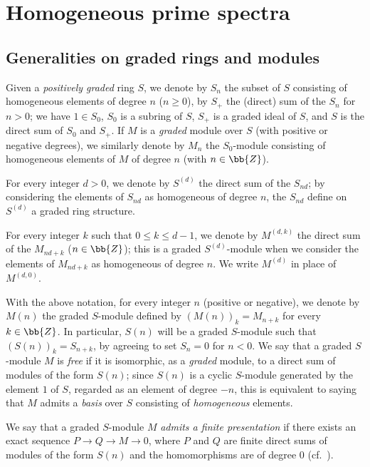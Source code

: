 \section{Homogeneous prime spectra}
\label{section:II.2}

\subsection{Generalities on graded rings and modules}
\label{subsection:II.2.1}

\begin{notation}[2.1.1]
\label{II.2.1.1}
Given a \emph{positively graded} ring $S$, we denote by $S_n$ the subset of $S$ consisting of homogeneous elements of degree $n$ ($n\geq 0$), by $S_+$ the (direct) sum of the $S_n$ for $n>0$;
we have $1\in S_0$, $S_0$ is a subring of $S$, $S_+$ is a graded ideal of $S$, and $S$ is the direct sum of $S_0$ and $S_+$.
If $M$ is a \emph{graded} module over $S$ (with positive or negative degrees), we similarly denote by $M_n$ the $S_0$-module consisting of homogeneous elements of $M$ of degree $n$ (with $n\in\bb{Z}$).

For every integer $d>0$, we denote by $S^{(d)}$ the direct sum of the $S_{nd}$;
by considering the elements of $S_{nd}$ as homogeneous of degree $n$, the $S_{nd}$ define on $S^{(d)}$ a graded ring structure.

For every integer $k$ such that $0\leq k\leq d-1$, we denote by $M^{(d,k)}$ the direct sum
of the $M_{nd+k}$ ($n\in\bb{Z}$);
this is a graded $S^{(d)}$-module when we consider the elements of $M_{nd+k}$ as homogeneous of degree $n$.
We write $M^{(d)}$ in place of $M^{(d,0)}$.

With the above notation, for every integer $n$ (positive or negative), we denote by $M(n)$ the graded $S$-module defined by $(M(n))_k=M_{n+k}$ for every $k\in\bb{Z}$.
In particular, $S(n)$ will be a graded $S$-module such that $(S(n))_k=S_{n+k}$, by agreeing to set $S_n=0$ for $n<0$.
We say that a graded $S$-module $M$ is \emph{free} if it is isomorphic, as a \emph{graded} module, to a direct sum of modules of the form $S(n)$;
since $S(n)$ is a cyclic $S$-module generated by the element $1$ of $S$, regarded as an element of degree $-n$, this is equivalent to saying that $M$ admits a \emph{basis} over $S$ consisting of \emph{homogeneous} elements.

We say that a graded $S$-module $M$ \emph{admits a finite presentation} if there exists an exact sequence $P\to Q\to M\to 0$, where $P$ and $Q$ are finite direct sums of modules of the form $S(n)$ and the homomorphisms are of degree $0$ (cf.~).
\end{notation}

